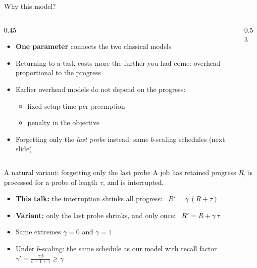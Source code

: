 \documentclass[aspectratio=169,11pt]{beamer}
\newcommand{\src}[2][]{{\footnotesize\color{ztgray}%
  \if\relax\detokenize{#1}\relax\cite{#2}\else\cite[#1]{#2}\fi}}
\begin{document}
\begin{frame}{Why this model?}
  \begin{columns}[c]
    \begin{column}{0.45\textwidth}
      \begin{itemize}
        \item \textbf{One parameter} connects the two classical models
        \item Returning to a task costs more the further you had come:
              overhead \alert{proportional to the progress}
        \item Earlier overhead models do not depend on the progress:
          \begin{itemize}
            \item fixed setup time per preemption \src{lc04}\,\src{cll12}
            \item penalty in the objective \src{blss06}
          \end{itemize}
        \item Forgetting only the \emph{last probe} instead:
              same $b$-scaling schedules (next slide)
      \end{itemize}
    \end{column}
    \begin{column}{0.53\textwidth}
      \centering
      
    \end{column}
  \end{columns}
\end{frame}

\begin{frame}{A natural variant: forgetting only the last probe}
  A job has retained progress $R$, is processed for a probe of length $\tau$, and is interrupted.
  \begin{itemize}
    \item \textbf{This talk:} the interruption shrinks \alert{all} progress:
          \ $R' = \gamma\,(R+\tau)$
    \item \textbf{Variant:} only the last probe shrinks, and only once:
          \ $R' = R + \gamma\,\tau$
  \end{itemize}
  \vfill
  \centering
  
  \vfill
  \begin{itemize}
    \item Same extremes $\gamma = 0$ and $\gamma = 1$
    \item Under $b$-scaling: the same schedule as our model with recall factor
          $\gamma' = \frac{\gamma\, b}{b-1+\gamma} \ge \gamma$
  \end{itemize}
\end{frame}
\end{document}
